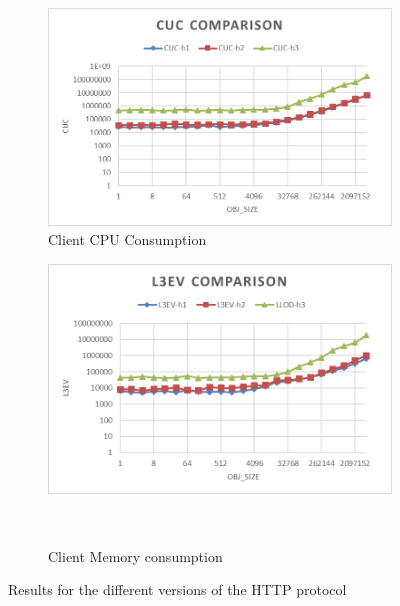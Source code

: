 \documentclass[runningheads]{llncs}
\begin{document}
\begin{figure}[!bt]
  \begin{subfigure}[t]{0.49\textwidth}
\includegraphics[width=1\textwidth]{cuc-h2load-mistral.png}\vspace{-0.5em}
        \caption{Client CPU Consumption}		\label {fig:cuc-comp}
  \end{subfigure}
  \begin{subfigure}[t]{0.49\textwidth}
        \includegraphics[width=1\textwidth]{l3ev-h2load-mistral.png}\vspace{-0.5em}
        \caption{Client Memory consumption}\		\label {fig:llod-comp}
  \end{subfigure}





\vspace{-0.5em}
\caption{Results for the different versions of the HTTP protocol}
\end{figure}
\end{document}
